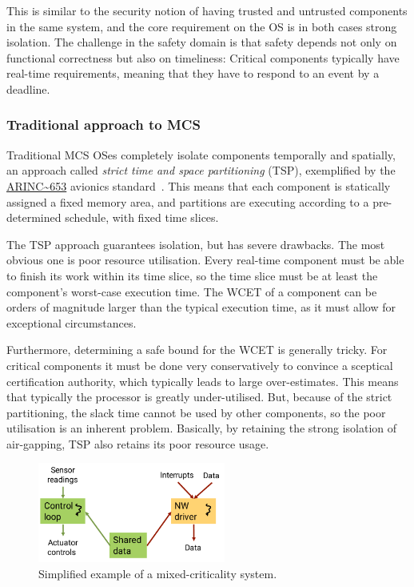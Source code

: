 \documentclass[english,a4paper,12pt\ifDraft,draft\fi]{report}
\newcommand{\SSSect}[1]{\subsubsection*{#1}}
\newcommand{\SSSect}[1]{\subsection*{#1}}
\providecommand{\href}[2]{\url{#2}}
\begin{document}
  This is similar to the security notion of having trusted and
  untrusted components in the same system, and the core requirement on
  the OS is in both cases strong isolation. The challenge in the
  safety domain is that safety depends not only on functional
  correctness but also on timeliness: Critical components typically
  have real-time requirements, meaning that they have to respond to an
  event by a deadline.

  \SSSect{Traditional approach to MCS}

  Traditional MCS OSes completely isolate components temporally and
  spatially, an approach called \emph{strict time and space
    partitioning} (TSP), exemplified by the
  \href{https://en.wikipedia.org/wiki/ARINC_653}{ARINC~653} avionics
  standard~\citep{ARINC653}. This means that each component is
  statically assigned a fixed memory area, and partitions are
  executing according to a pre-determined schedule, with fixed time
  slices.

  The TSP approach guarantees isolation, but has severe drawbacks. The
  most obvious one is poor resource utilisation. Every real-time component must
  be able to finish its work within its time slice, so the time slice
  must be at least the component's worst-case execution time.
  The WCET of a component can be orders of magnitude larger
  than the typical execution time, as it must allow for exceptional circumstances.

  Furthermore, determining a safe bound for the WCET is generally
  tricky. For critical components it must be done very conservatively
  to convince a sceptical certification authority, which typically
  leads to large over-estimates. This means that typically the
  processor is greatly under-utilised. But, because of the strict
  partitioning, the slack time cannot be used by other components, so
  the poor utilisation is an inherent problem. Basically, by retaining
  the strong isolation of air-gapping, TSP also retains its poor
  resource usage.

  \begin{figure}[b]
    \centering
    \includegraphics[width=0.55\textwidth]{mcs}
    \caption{Simplified example of a mixed-criticality system.}
    \label{f:mcs}
  \end{figure}
\end{document}
